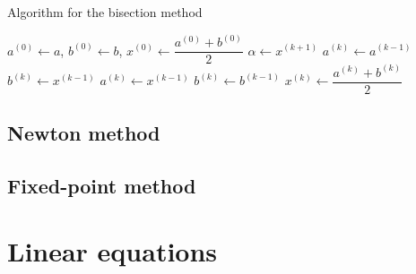 \documentclass[12pt, a4paper]{report}
\newtheorem[style=M,bodystyle=\normalfont]{theorem}{Theorem}
\newtheorem[style=M,bodystyle=\normalfont]{corollary}{Corollary}
\newtheorem[style=M,bodystyle=\normalfont]{lemma}{Lemma}
\newtheorem[style=M,bodystyle=\normalfont]{definition}{Definition}
\begin{document}
    \begin{algorithm}[H]
        \caption{Algorithm for the bisection method}
            \begin{algorithmic}[1]
                \State $a^{(0)} \leftarrow a$, $b^{(0)} \leftarrow b$, $x^{(0)} \leftarrow \dfrac{a^{(0)}+b^{(0)}}{2}$
                        \State $\alpha \leftarrow x^{(k+1)}$
                        \State \Return
                    \Else
                            \State $a^{(k)}\leftarrow a^{(k-1)}$
                            \State $b^{(k)}\leftarrow x^{(k-1)}$
                        \EndIf
                            \State $a^{(k)}\leftarrow x^{(k-1)}$
                            \State $b^{(k)}\leftarrow b^{(k-1)}$
                        \EndIf
                        \State $x^{(k)} \leftarrow \dfrac{a^{(k)}+b^{(k)}}{2}$
                    \EndIf
                \EndWhile
                \State \Return
            \end{algorithmic}
    \end{algorithm}




    \section{Newton method}
    


    \section{Fixed-point method}




\chapter{Linear equations}
\end{document}
